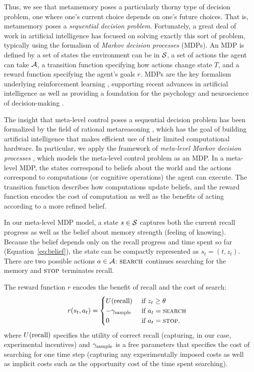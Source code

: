 Thus, we see that metamemory poses a particularly thorny type of decision problem, one where one's current choice depends on one's future choices. That is, metamemory poses a \emph{sequential decision problem}. Fortunately, a great deal of work in artificial intelligence has focused on solving exactly this sort of problem, typically using the formalism of \emph{Markov decision processes} (MDPs). An MDP is defined by a set of states the environment can be in $\S$, a set of actions the agent can take $\A$, a transition function specifying how actions change state $T$, and a reward function specifying the agent's goals $r$. MDPs are the key formalism underlying reinforcement learning \citep{sutton2018reinforcement}, supporting recent advances in artificial intelligence \citep{mnih2015human,silver2017mastering} as well as providing a foundation for the psychology and neuroscience of decision-making \citep{niv2009reinforcement,dayan2008decision,glimcher2011understanding}.

The insight that meta-level control poses a sequential decision problem has been formalized by the field of rational metareasoning \citep{russell1991principles}, which has the goal of building artificial intelligence that makes efficient use of their limited computational hardware. In particular, we apply the framework of \emph{meta-level Markov decision processes} \citep{hay2012selecting}, which models the meta-level control problem as an MDP. In a meta-level MDP, the states correspond to beliefs about the world and the actions correspond to computations (or cognitive operations) the agent can execute. The transition function describes how computations update beliefs, and the reward function encodes the cost of computation as well as the benefits of acting according to a more refined belief.

In our meta-level MDP model, a state $s \in \S$ captures both the current recall progress as well as the belief about memory strength (feeling of knowing). Because the belief depends only on the recall progress and time spent so far (Equation~\ref{eq:belief}), the state can be compactly represented as $s_t = (t, z_t)$. There are two possible actions $a \in \A$: $\search$ continues searching for the memory and $\term$ terminates recall. 

The reward function $r$ encodes the benefit of recall and the cost of search:
\begin{equation}\label{eq:reward}
  r(s_t, a_t) = \begin{cases} 
    U\recall & \text{ if } z_t \geq \theta \\
    -\samplecost & \text{ if } a_t = \search \\
    0 & \text{ if } a_t = \term.
  \end{cases}
\end{equation}
where $U\recall$ specifies the utility of correct recall (capturing, in our case, experimental incentives) and $\samplecost$ is a free parameters that specifies the cost of searching for one time step (capturing any experimentally imposed costs as well as implicit costs such as the opportunity cost of the time spent searching).

